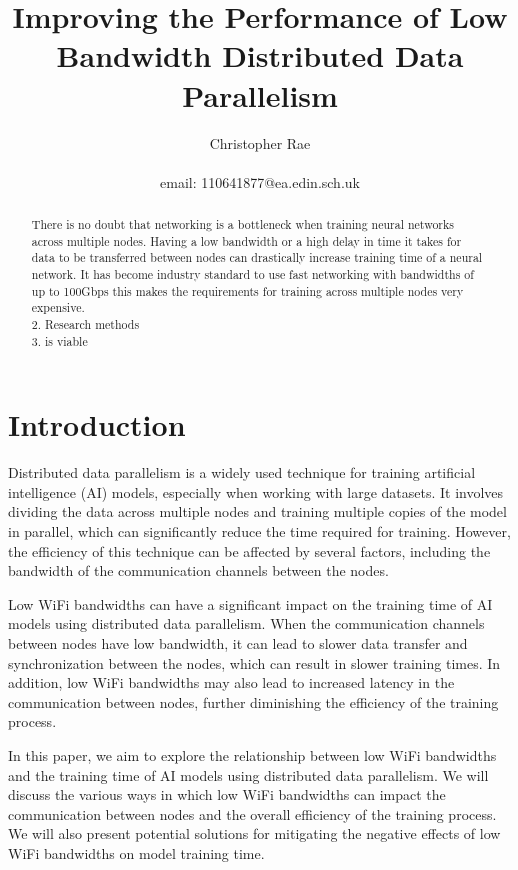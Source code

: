 \documentclass[11pt]{article}
\title{Improving the Performance of Low Bandwidth Distributed Data Parallelism}
\author{Christopher Rae \\ \begin{small} email: 110641877@ea.edin.sch.uk \end{small}}
\date{}
\begin{document}
\maketitle
\tableofcontents
\newpage

\begin{abstract}
There is no doubt that networking is a bottleneck when training neural networks across multiple nodes. Having a low bandwidth or a high delay in time it takes for data to be transferred between nodes can drastically increase training time of a neural network. It has become industry standard to use fast networking with bandwidths of up to 100Gbps this makes the requirements for training across multiple nodes very expensive. \\
2. Research methods\\
3. is viable
\end{abstract}


\section{Introduction}
Distributed data parallelism is a widely used technique for training artificial intelligence (AI) models, especially when working with large datasets. It involves dividing the data across multiple nodes and training multiple copies of the model in parallel, which can significantly reduce the time required for training. However, the efficiency of this technique can be affected by several factors, including the bandwidth of the communication channels between the nodes.

Low WiFi bandwidths can have a significant impact on the training time of AI models using distributed data parallelism. When the communication channels between nodes have low bandwidth, it can lead to slower data transfer and synchronization between the nodes, which can result in slower training times. In addition, low WiFi bandwidths may also lead to increased latency in the communication between nodes, further diminishing the efficiency of the training process.

In this paper, we aim to explore the relationship between low WiFi bandwidths and the training time of AI models using distributed data parallelism. We will discuss the various ways in which low WiFi bandwidths can impact the communication between nodes and the overall efficiency of the training process. We will also present potential solutions for mitigating the negative effects of low WiFi bandwidths on model training time.
\end{document}
